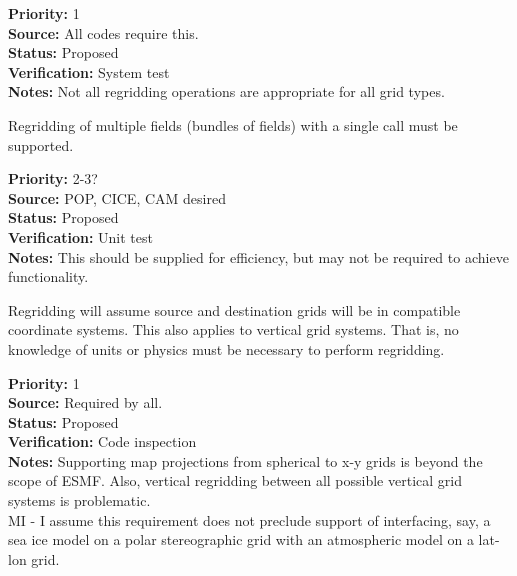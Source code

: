 \begin{reqlist}
{\bf Priority:} 1 \\
{\bf Source:} All codes require this. \\
{\bf Status:} Proposed \\
{\bf Verification:} System test \\
{\bf Notes:} Not all regridding operations are appropriate for all
             grid types.
\end{reqlist}


Regridding of multiple fields (bundles of fields) with
a single call must be supported.

\begin{reqlist}
{\bf Priority:} 2-3? \\
{\bf Source:} POP, CICE, CAM desired \\
{\bf Status:} Proposed \\
{\bf Verification:} Unit test \\
{\bf Notes:} This should be supplied for efficiency, but may not
             be required to achieve functionality.
\end{reqlist}


Regridding will assume source and destination grids will be
in compatible coordinate systems.  This also applies to vertical
grid systems.
That is, no knowledge of units or physics must be necessary
to perform regridding.

\begin{reqlist}
{\bf Priority:} 1 \\
{\bf Source:} Required by all. \\
{\bf Status:} Proposed \\
{\bf Verification:} Code inspection  \\
{\bf Notes:} Supporting map projections from spherical to x-y grids is
             beyond the scope of ESMF.  Also, vertical regridding
             between all possible vertical grid systems is problematic.
             \\
             MI - I assume this requirement does not preclude support
             of interfacing, say, 
             a sea ice model on a polar stereographic grid
             with an atmospheric model on a lat-lon grid.
\end{reqlist}

